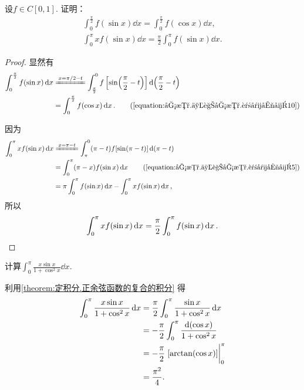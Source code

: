 \begin{proposition}\label{theorem:定积分.正余弦函数的复合的积分}
设\(f \in C[0,1]\).
证明：\begin{gather}
	\int_0^{\frac\pi2} f(\sin x) \dd{x}
	= \int_0^{\frac\pi2} f(\cos x) \dd{x}, \\
	\int_0^\pi x f(\sin x) \dd{x}
	= \frac{\pi}{2} \int_0^\pi f(\sin x) \dd{x}.
\end{gather}
\begin{proof}
显然有\begin{align*}
	\int_0^{\frac\pi2} f(\sin x) \dd{x}
	&\xlongequal{x = \pi/2-t}
		\int_{\frac\pi2}^0 f\left[\sin(\frac{\pi}{2}-t)\right] \dd(\frac{\pi}{2}-t) \\
	&= \int_0^{\frac\pi2} f(\cos x) \dd{x}.
		\tag{\cref{equation:函数.三角函数.诱导公式10}}
\end{align*}

因为\begin{align*}
	\int_0^\pi x f(\sin x) \dd{x}
	&\xlongequal{x = \pi-t}
		\int_{\pi}^0 (\pi-t) f[\sin(\pi-t)] \dd(\pi-t) \\
	&= \int_0^\pi (\pi-x) f(\sin x) \dd{x}
		\tag{\cref{equation:函数.三角函数.诱导公式5}} \\
	&= \pi \int_0^\pi f(\sin x) \dd{x}
		- \int_0^\pi x f(\sin x) \dd{x},
\end{align*}
所以\[
	\int_0^\pi x f(\sin x) \dd{x}
	= \frac{\pi}{2} \int_0^\pi f(\sin x) \dd{x}.
	\qedhere
\]
\end{proof}
\end{proposition}

\begin{example}
计算\(\int_0^\pi \frac{x \sin x}{1 + \cos^2 x} \dd{x}\).
\begin{solution}
利用\cref{theorem:定积分.正余弦函数的复合的积分} 得\begin{align*}
	\int_0^\pi \frac{x \sin x}{1 + \cos^2 x} \dd{x}
	&= \frac\pi2 \int_0^\pi \frac{\sin x}{1 + \cos^2 x} \dd{x} \\
	&= -\frac\pi2 \int_0^\pi \frac{\dd(\cos x)}{1 + \cos^2 x} \\
	&= -\frac\pi2 \eval{[\arctan(\cos x)]}_0^\pi \\
	&= \frac{\pi^2}4.
\end{align*}
\end{solution}
\end{example}

